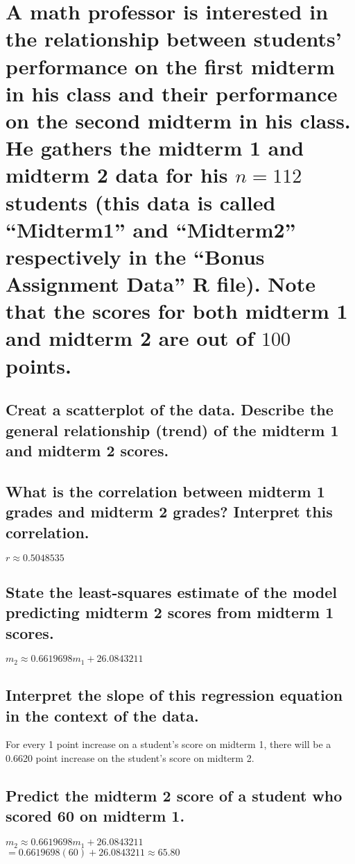 \section{A math professor is interested in the relationship between students’ performance on the
    first midterm in his class and their performance on the second midterm in his class. He
    gathers the midterm 1 and midterm 2 data for his $n = 112$ students (this data is called
    “Midterm1” and “Midterm2” respectively in the “Bonus Assignment Data” R file). Note that
    the scores for both midterm 1 and midterm 2 are out of $100$ points.}
    \begin{multicols}{2}
        \subsection{Creat a scatterplot of the data. Describe the general relationship (trend) 
            of the midterm 1 and midterm 2 scores.}
            \begin{center}  
                
            \end{center}

        \subsection{What is the correlation between midterm 1 grades and midterm 2 grades? Interpret
            this correlation.}
            $r \approx 0.5048535$

        \subsection{State the least-squares estimate of the model predicting midterm 2 scores from
            midterm 1 scores.}
            $m_2 \approx 0.6619698m_1 + 26.0843211$

        \subsection{Interpret the slope of this regression equation in the context of the data.}
            For every 1 point increase on a student's score on midterm 1, 
            there will be a 0.6620 point increase on the student's score on midterm 2.

        \subsection{Predict the midterm 2 score of a student who scored 60 on midterm 1.}
            $m_2 \approx 0.6619698m_1 + 26.0843211$\\
            $= 0.6619698(60) + 26.0843211 \approx 65.80$


\end{multicols}
